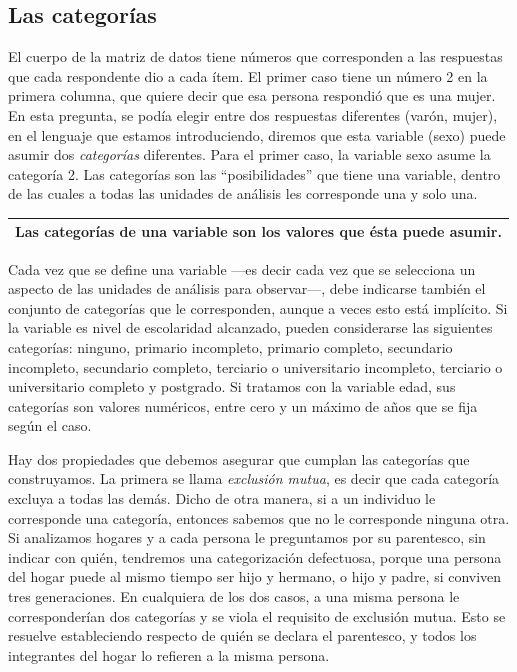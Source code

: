 \documentclass[]{book}
\begin{document}
\hypertarget{las-categorias}{%
\subsection{Las categorías}\label{las-categorias}}

El cuerpo de la matriz de datos tiene números que corresponden a las respuestas que cada respondente dio a cada ítem. El primer caso tiene un número 2 en la primera columna, que quiere decir que esa persona respondió que es una mujer. En esta pregunta, se podía elegir entre dos respuestas diferentes (varón, mujer), en el lenguaje que estamos introduciendo, diremos que esta variable (sexo) puede asumir dos \emph{categorías} diferentes. Para el primer caso, la variable sexo asume la categoría 2. Las categorías son las ``posibilidades'' que tiene una variable, dentro de las cuales a todas las unidades de análisis les corresponde una y solo una.

\begin{longtable}[]{@{}c@{}}
\toprule
\endhead
Las \textbf{categorías} de una variable son los valores que ésta puede asumir.\tabularnewline
\bottomrule
\end{longtable}

Cada vez que se define una variable ---es decir cada vez que se selecciona un aspecto de las unidades de análisis para observar---, debe indicarse también el conjunto de categorías que le corresponden, aunque a veces esto está implícito. Si la variable es nivel de escolaridad alcanzado, pueden considerarse las siguientes categorías: ninguno, primario incompleto, primario completo, secundario incompleto, secundario completo, terciario o universitario incompleto, terciario o universitario completo y postgrado. Si tratamos con la variable edad, sus categorías son valores numéricos, entre cero y un máximo de años que se fija según el caso.

Hay dos propiedades que debemos asegurar que cumplan las categorías que construyamos. La primera se llama \emph{exclusión mutua}, es decir que cada categoría excluya a todas las demás. Dicho de otra manera, si a un individuo le corresponde una categoría, entonces sabemos que no le corresponde ninguna otra. Si analizamos hogares y a cada persona le preguntamos por su parentesco, sin indicar con quién, tendremos una categorización defectuosa, porque una persona del hogar puede al mismo tiempo ser hijo y hermano, o hijo y padre, si conviven tres generaciones. En cualquiera de los dos casos, a una misma persona le corresponderían dos categorías y se viola el requisito de exclusión mutua. Esto se resuelve estableciendo respecto de quién se declara el parentesco, y todos los integrantes del hogar lo refieren a la misma persona.
\end{document}
